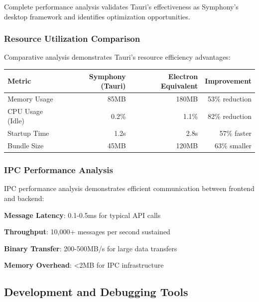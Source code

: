 Complete performance analysis validates Tauri's effectiveness as Symphony's desktop framework and identifies optimization opportunities.

\subsubsection*{Resource Utilization Comparison}

Comparative analysis demonstrates Tauri's resource efficiency advantages:

\begin{center}
\begin{tabular}{@{}lrrr@{}}
\toprule
\textbf{Metric} & \textbf{Symphony (Tauri)} & \textbf{Electron Equivalent} & \textbf{Improvement} \\
\midrule
Memory Usage & 85MB & 180MB & 53\% reduction \\
CPU Usage (Idle) & 0.2\% & 1.1\% & 82\% reduction \\
Startup Time & 1.2s & 2.8s & 57\% faster \\
Bundle Size & 45MB & 120MB & 63\% smaller \\
\bottomrule
\end{tabular}
\end{center}

\subsubsection*{IPC Performance Analysis}

IPC performance analysis demonstrates efficient communication between frontend and backend:

\begin{compactlist}
    \item \textbf{Message Latency}: 0.1-0.5ms for typical API calls
    \item \textbf{Throughput}: 10,000+ messages per second sustained
    \item \textbf{Binary Transfer}: 200-500MB/s for large data transfers
    \item \textbf{Memory Overhead}: <2MB for IPC infrastructure
\end{compactlist}

\subsection*{Development and Debugging Tools}

